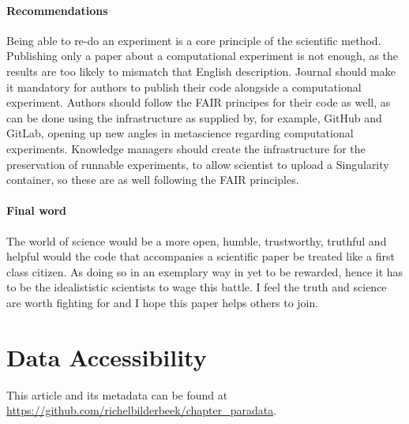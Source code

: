 \paragraph{Recommendations}

Being able to re-do an experiment is a core principle of the scientific method.
Publishing only a paper about a computational experiment is not enough,
as the results are too likely to mismatch that English description.
Journal should make it mandatory for authors
to publish their code alongside a computational experiment.
Authors should follow the FAIR principes for their code as well,
as can be done using the infrastructure as supplied by, 
for example, GitHub and GitLab, opening up new angles in
metascience regarding computational experiments.
Knowledge managers should create the infrastructure for the preservation
of runnable experiments, to allow scientist to upload a Singularity
container, so these are as well following the FAIR principles.

\paragraph{Final word}

The world of science would be a more open, humble, trustworthy, truthful
and helpful would the code that accompanies a scientific paper
be treated like a first class citizen. As doing so in an exemplary way
in yet to be rewarded, hence it has to be the idealististic scientists
to wage this battle. I feel the truth and science are worth fighting for
and I hope this paper helps others to join.

\section{Data Accessibility}

This article and its metadata can be found at 
\url{https://github.com/richelbilderbeek/chapter_paradata}.




\newpage
\appendix
